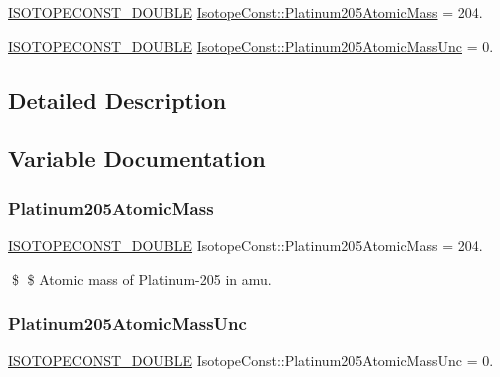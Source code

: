 \begin{DoxyCompactItemize}
\item 
\mbox{\hyperlink{group___isotope_const-_macros_ga8f45a7272ce02c0b4c65c44636ed719a}{I\+S\+O\+T\+O\+P\+E\+C\+O\+N\+S\+T\+\_\+\+D\+O\+U\+B\+LE}} \mbox{\hyperlink{group___isotope_const-_platinum-_pt205_ga3ab29474a3221d9e980103a76279b5e3}{Isotope\+Const\+::\+Platinum205\+Atomic\+Mass}} = 204.
\item 
\mbox{\hyperlink{group___isotope_const-_macros_ga8f45a7272ce02c0b4c65c44636ed719a}{I\+S\+O\+T\+O\+P\+E\+C\+O\+N\+S\+T\+\_\+\+D\+O\+U\+B\+LE}} \mbox{\hyperlink{group___isotope_const-_platinum-_pt205_ga59fc05d7bc0eebae8076e6e35184dee9}{Isotope\+Const\+::\+Platinum205\+Atomic\+Mass\+Unc}} = 0.
\end{DoxyCompactItemize}


\subsection{Detailed Description}


\subsection{Variable Documentation}
\mbox{\label{group___isotope_const-_platinum-_pt205_ga3ab29474a3221d9e980103a76279b5e3}} 
\subsubsection{\texorpdfstring{Platinum205\+Atomic\+Mass}{Platinum205AtomicMass}}
{\footnotesize\ttfamily \mbox{\hyperlink{group___isotope_const-_macros_ga8f45a7272ce02c0b4c65c44636ed719a}{I\+S\+O\+T\+O\+P\+E\+C\+O\+N\+S\+T\+\_\+\+D\+O\+U\+B\+LE}} Isotope\+Const\+::\+Platinum205\+Atomic\+Mass = 204.}

\$ \$ Atomic mass of Platinum-\/205 in amu. \mbox{\label{group___isotope_const-_platinum-_pt205_ga59fc05d7bc0eebae8076e6e35184dee9}} 
\subsubsection{\texorpdfstring{Platinum205\+Atomic\+Mass\+Unc}{Platinum205AtomicMassUnc}}
{\footnotesize\ttfamily \mbox{\hyperlink{group___isotope_const-_macros_ga8f45a7272ce02c0b4c65c44636ed719a}{I\+S\+O\+T\+O\+P\+E\+C\+O\+N\+S\+T\+\_\+\+D\+O\+U\+B\+LE}} Isotope\+Const\+::\+Platinum205\+Atomic\+Mass\+Unc = 0.}


